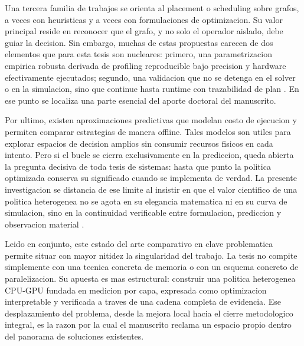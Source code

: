 Una tercera familia de trabajos se orienta al placement o scheduling sobre grafos, a veces con heuristicas y a veces con formulaciones de optimizacion. Su valor principal reside en reconocer que el grafo, y no solo el operador aislado, debe guiar la decision. Sin embargo, muchas de estas propuestas carecen de dos elementos que para esta tesis son nucleares: primero, una parametrizacion empirica robusta derivada de profiling reproducible bajo precision y hardware efectivamente ejecutados; segundo, una validacion que no se detenga en el solver o en la simulacion, sino que continue hasta runtime con trazabilidad de plan \cite{narayanan2019pipedream,zheng2022alpa}. En ese punto se localiza una parte esencial del aporte doctoral del manuscrito.

Por ultimo, existen aproximaciones predictivas que modelan costo de ejecucion y permiten comparar estrategias de manera offline. Tales modelos son utiles para explorar espacios de decision amplios sin consumir recursos fisicos en cada intento. Pero si el bucle se cierra exclusivamente en la prediccion, queda abierta la pregunta decisiva de toda tesis de sistemas: hasta que punto la politica optimizada conserva su significado cuando se implementa de verdad. La presente investigacion se distancia de ese limite al insistir en que el valor cientifico de una politica heterogenea no se agota en su elegancia matematica ni en su curva de simulacion, sino en la continuidad verificable entre formulacion, prediccion y observacion material \cite{narayanan2019pipedream,zheng2022alpa}.

Leido en conjunto, este estado del arte comparativo en clave problematica permite situar con mayor nitidez la singularidad del trabajo. La tesis no compite simplemente con una tecnica concreta de memoria o con un esquema concreto de paralelizacion. Su apuesta es mas estructural: construir una politica heterogenea CPU-GPU fundada en medicion por capa, expresada como optimizacion interpretable y verificada a traves de una cadena completa de evidencia. Ese desplazamiento del problema, desde la mejora local hacia el cierre metodologico integral, es la razon por la cual el manuscrito reclama un espacio propio dentro del panorama de soluciones existentes.

